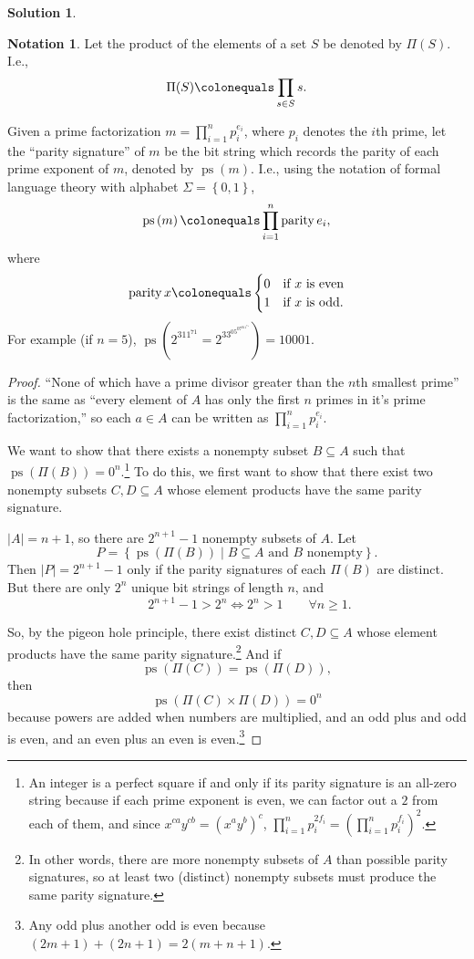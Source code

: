 \documentclass{article}
\theoremstyle{definition}
\newtheorem{sol}{Solution}
\newtheorem*{nota}{Notation}
\theoremstyle{plain}
\newcommand{\ps}[1]{\operatorname{ps}\left(#1\right)}
\newcommand{\set}[1]{\left\{#1\right\}}
\newcommand{\len}[1]{\left|#1\right|}
\newcommand{\elemp}[1]{\Pi(#1)}
\newcommand{\defeq}{\colonequals}
\begin{document}
\begin{sol}
\begin{nota}
Let the product of the elements of a set $S$ be denoted by $\elemp{S}$. I.e.,
\[
\elemp{S} \defeq \prod_{s \in S}s.
\]

Given a prime factorization $m = \prod_{i = 1}^n p_i^{e_i}$, where $p_i$ denotes the $i$th prime, let the ``parity signature'' of
$m$ be the bit string which records the parity of each prime exponent of $m$, denoted by $\ps{m}$. I.e., using the notation of formal language theory with alphabet $\Sigma = \set{0,1}$,
\[
\ps{m} \defeq \prod_{i = 1}^n \operatorname{parity} e_i,
\]
where
\[
\operatorname{parity} x \defeq \begin{cases} 0 & \text{if $x$ is even}\\
1 & \text{if $x$ is odd}.\end{cases}
\]
For example (if $n = 5$), $\ps{2^311^{71} = 2^33^05^07^011^{71}} = 10001$.
\end{nota}

\begin{proof}
``None of which have a prime divisor greater than the $n$th smallest prime'' is the same as ``every element of $A$ has only the first $n$ primes in it's prime factorization,'' so each $a \in A$ can be written as $\prod_{i=1}^np_i^{e_i}$.

We want to show that there exists a nonempty subset $B \subseteq A$ such that $\ps{\elemp{B}} = 0^n$.\footnote{An integer is a perfect square if and only if its parity signature is an all-zero string because if each prime exponent is even, we can factor out a $2$ from each of them, and since
$x^{ca}y^{cb} = {(x^ay^b)}^c$, $\prod_{i=1}^np_i^{2f_i} = {(\prod_{i=1}^np_i^{f_i})}^2$.} To do this, we first want to show that there exist two nonempty subsets $C,D\subseteq A$ whose element products have the same parity signature.

$\len{A} = n+1$, so there are $2^{n+1} - 1$ nonempty subsets of $A$. Let
\[
P = \set{\ps{\elemp{B}} \mid B \subseteq A \text{ and $B$ nonempty}}.
\]
Then $\len{P} = 2^{n+1} -1$ only if the parity signatures of each $\elemp{B}$ are distinct. But there are only $2^n$ unique bit strings of length $n$, and
\[
\qquad 2^{n+1} - 1 > 2^n \iff 2^n > 1 \qquad \forall n\ge 1.
\]

So, by the pigeon hole principle, there exist distinct $C, D \subseteq A$ whose element products have the same parity signature.\footnote{In other words, there are more nonempty subsets of $A$ than possible parity signatures, so at least two (distinct) nonempty subsets must produce the same parity signature.} And if
\[
\ps{\elemp{C}} = \ps{\elemp{D}},
\]
then
\begin{equation}\label{eq:perf}
\ps{\elemp{C}\times\elemp{D}} = 0^n
\end{equation}
because powers are added when numbers are multiplied, and an odd plus and odd is even, and an even plus an even is even.\footnote{Any odd plus another odd is even because $(2m + 1) + (2n + 1) = 2(m + n + 1)$.}


\end{proof}
\end{sol}
\end{document}
